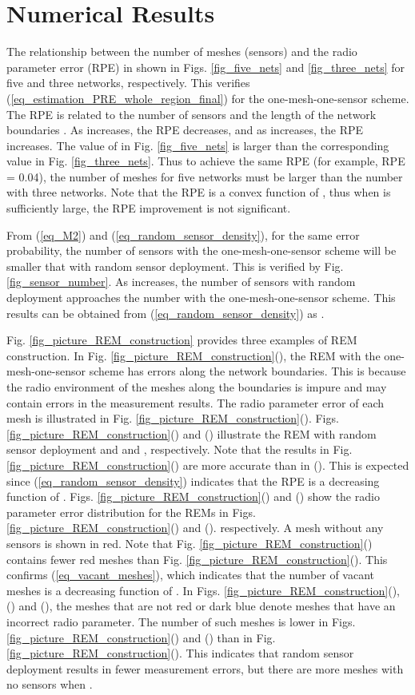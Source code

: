 \documentclass[conference]{IEEEtran}
\begin{document}
\section{Numerical Results}

The relationship between the number of meshes (sensors) and the radio parameter error (RPE) in shown in Figs. \ref{fig_five_nets} and \ref{fig_three_nets}
for five and three networks, respectively.
This verifies (\ref{eq_estimation_PRE_whole_region_final}) for the one-mesh-one-sensor scheme.
The RPE is related to the number of sensors  and the length of the network boundaries .
As  increases, the RPE decreases, and as  increases, the RPE increases.
The value of  in Fig. \ref{fig_five_nets} is larger than the corresponding value in Fig. \ref{fig_three_nets}.
Thus to achieve the same RPE (for example, RPE = 0.04), the number of meshes for five networks must be larger than the number with three networks.
Note that the RPE is a convex function of , thus when  is sufficiently large, the RPE improvement is not significant.

From (\ref{eq_M2}) and (\ref{eq_random_sensor_density}), for the same error probability, the number of sensors with the one-mesh-one-sensor scheme
will be smaller that with random sensor deployment.
This is verified by Fig. \ref{fig_sensor_number}.
As  increases, the number of sensors with random deployment approaches the number with the one-mesh-one-sensor scheme.
This results can be obtained from (\ref{eq_random_sensor_density}) as .

Fig. \ref{fig_picture_REM_construction} provides three examples of REM construction.
In Fig. \ref{fig_picture_REM_construction}(), the REM with the one-mesh-one-sensor scheme has errors along the network boundaries.
This is because the radio environment of the meshes along the boundaries is impure and may contain errors in the measurement results.
The radio parameter error of each mesh is illustrated in Fig. \ref{fig_picture_REM_construction}().
Figs. \ref{fig_picture_REM_construction}() and () illustrate the REM with random sensor deployment and  and , respectively.
Note that the results in Fig. \ref{fig_picture_REM_construction}() are more accurate than in ().
This is expected since (\ref{eq_random_sensor_density}) indicates that the RPE is a decreasing function of .
Figs. \ref{fig_picture_REM_construction}() and () show the radio parameter error distribution for the REMs in
Figs. \ref{fig_picture_REM_construction}() and (). respectively.
A mesh without any sensors is shown in red.
Note that Fig. \ref{fig_picture_REM_construction}() contains fewer red meshes than Fig. \ref{fig_picture_REM_construction}().
This confirms (\ref{eq_vacant_meshes}), which indicates that the number of vacant meshes is a decreasing function of .
In Figs. \ref{fig_picture_REM_construction}(), () and (), the meshes that are not red or dark blue
denote meshes that have an incorrect radio parameter.
The number of such meshes is lower in Figs. \ref{fig_picture_REM_construction}() and ()
than in Fig. \ref{fig_picture_REM_construction}().
This indicates that random sensor deployment results in fewer measurement errors, but there are more meshes with no sensors when .
\end{document}
